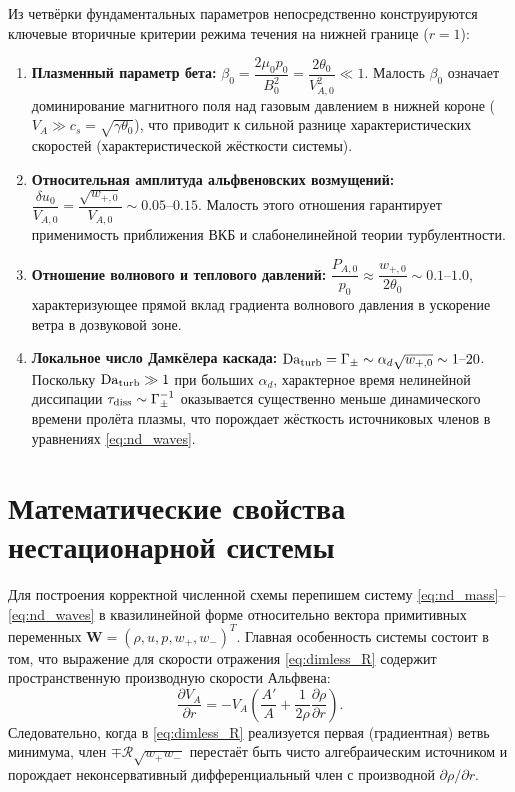 \documentclass[11pt,a4paper]{article}
\begin{document}
Из четвёрки фундаментальных параметров непосредственно конструируются ключевые вторичные критерии режима течения на нижней границе ($r = 1$):
\begin{enumerate}
\item \textbf{Плазменный параметр бета:} $\beta_0 = \dfrac{2\mu_0 p_0}{B_0^2} = \dfrac{2\theta_0}{V_{A,0}^2} \ll 1$. Малость $\beta_0$ означает доминирование магнитного поля над газовым давлением в нижней короне ($V_A \gg c_s = \sqrt{\gamma\theta_0}$), что приводит к сильной разнице характеристических скоростей (характеристической жёсткости системы).
\item \textbf{Относительная амплитуда альфвеновских возмущений:} $\dfrac{\delta u_0}{V_{A,0}} = \dfrac{\sqrt{w_{+,0}}}{V_{A,0}} \sim 0.05\text{--}0.15$. Малость этого отношения гарантирует применимость приближения ВКБ и слабонелинейной теории турбулентности.
\item \textbf{Отношение волнового и теплового давлений:} $\dfrac{P_{A,0}}{p_0} \approx \dfrac{w_{+,0}}{2\theta_0} \sim 0.1\text{--}1.0$, характеризующее прямой вклад градиента волнового давления в ускорение ветра в дозвуковой зоне.
\item \textbf{Локальное число Дамкёлера каскада:} $\mathrm{Da}_{\rm turb} = \Gamma_\pm \sim \alpha_d\sqrt{w_{+,0}} \sim 1\text{--}20$. Поскольку $\mathrm{Da}_{\rm turb} \gg 1$ при больших $\alpha_d$, характерное время нелинейной диссипации $\tau_{\rm diss} \sim \Gamma_\pm^{-1}$ оказывается существенно меньше динамического времени пролёта плазмы, что порождает жёсткость источниковых членов в уравнениях \eqref{eq:nd_waves}.
\end{enumerate}

\section{Математические свойства нестационарной системы}

Для построения корректной численной схемы перепишем систему \eqref{eq:nd_mass}--\eqref{eq:nd_waves} в квазилинейной форме относительно вектора примитивных переменных $\bm{W} = (\rho, u, p, w_+, w_-)^T$. Главная особенность системы состоит в том, что выражение для скорости отражения \eqref{eq:dimless_R} содержит пространственную производную скорости Альфвена:
\begin{equation}
\frac{\partial V_A}{\partial r} = -V_A\left(\frac{A'}{A} + \frac{1}{2\rho}\frac{\partial\rho}{\partial r}\right).
\label{eq:dVA_dr}
\end{equation}
Следовательно, когда в \eqref{eq:dimless_R} реализуется первая (градиентная) ветвь минимума, член $\mp\mathcal{R}\sqrt{w_+ w_-}$ перестаёт быть чисто алгебраическим источником и порождает неконсервативный дифференциальный член с производной $\partial\rho/\partial r$.
\end{document}
